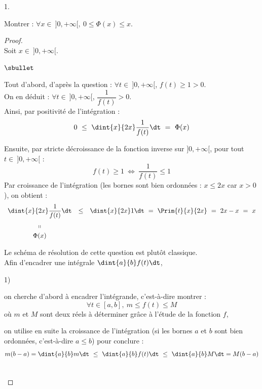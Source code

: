 \begin{noliste}{1.}
  
  \item Montrer : $\forall x \in \ ]0,+\infty[, \ 0 \leq \Phi(x) \leq 
  x$.
  
  \begin{proof}~\\
    Soit $x\in \ ]0,+\infty[$.
    \begin{noliste}{$\sbullet$}
      \item Tout d'abord, d'après la question  :
      $\forall t \in \ ]0,+\infty[$, $f(t) \geq 1 > 0$.\\[.1cm]
      On en déduit : $\forall t \in \ ]0,+\infty[$, $\dfrac{1}{f(t)}
      > 0$.\\[.1cm]
      Ainsi, par positivité de l'intégration :
      \[
        \begin{array}{ccc}
           0 \ \leq \ \dint{x}{2x} \dfrac{1}{f(t)} \dt \ = \
           \Phi(x)
        \end{array}
      \]
      
      \item Ensuite, par stricte décroissance de la fonction inverse
      sur $]0,+\infty[$, pour tout $t \in \ ]0,+\infty[$ :
      \[
        f(t) \geq 1 \ \Leftrightarrow \ \dfrac{1}{f(t)} \leq 1
      \]
      Par croissance de l'intégration (les bornes sont bien ordonnées 
      : $x \leq 2x$ car $x>0$), on obtient :
      \[
        \begin{array}{ccc}
          \dint{x}{2x} \dfrac{1}{f(t)} \dt & \leq & \dint{x}{2x} 1 \dt
          \ = \ \Prim{t}{x}{2x} \ = \ 2x-x \ = \ x
          \\[.4cm]
          \shortparallel
          \\[.1cm]
          \Phi(x)
        \end{array}
      \]
    \end{noliste}
    \conc{Finalement : $\forall x \in \ ]0,+\infty[$, $0 \leq 
    \Phi(x) \leq x$.}
    
    
    \newpage
    
    
    \begin{remark}
      Le schéma de résolution de cette question est plutôt classique.\\
      Afin d'encadrer une intégrale $\dint{a}{b} f(t) \dt$,
      \begin{noliste}{\scriptsize 1)}
        \item on cherche d'abord à encadrer l'intégrande, c'est-à-dire 
        montrer :
        \[
          \forall t \in [a,b], \ m \leq f(t) \leq M
        \]
        où $m$ et $M$ sont deux réels à déterminer grâce à l'étude de 
        la fonction $f$,
        \item on utilise en suite la croissance de l'intégration (si 
        les bornes $a$ et $b$ sont bien ordonnées, c'est-à-dire 
        $a \leq b$) pour conclure :
        \[
          m(b-a) = \dint{a}{b} m \dt \ \leq \ \dint{a}{b} f(t) \dt 
          \ \leq \ \dint{a}{b} M \dt = M(b-a)
        \]
      \end{noliste}
    \end{remark}~\\[-1.4cm]
  \end{proof}
  

\end{noliste}
